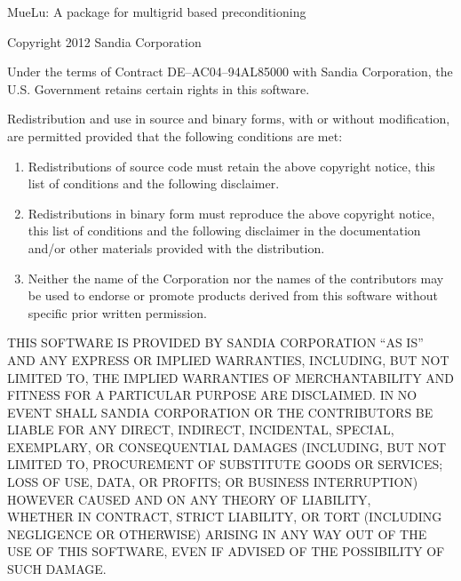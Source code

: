 \label{sec:license}
\begin{center}
MueLu: A package for multigrid based preconditioning

Copyright 2012 Sandia Corporation
\end{center}

\noindent
Under the terms of Contract DE--AC04--94AL85000 with Sandia Corporation,
the U.S. Government retains certain rights in this software.

\noindent
Redistribution and use in source and binary forms, with or without
modification, are permitted provided that the following conditions are
met:

\begin{enumerate}
  \item Redistributions of source code must retain the above copyright
    notice, this list of conditions and the following disclaimer.

\item Redistributions in binary form must reproduce the above copyright
  notice, this list of conditions and the following disclaimer in the
  documentation and/or other materials provided with the distribution.

\item Neither the name of the Corporation nor the names of the
  contributors may be used to endorse or promote products derived from
  this software without specific prior written permission.
\end{enumerate}

\noindent
THIS SOFTWARE IS PROVIDED BY SANDIA CORPORATION ``AS IS'' AND ANY
EXPRESS OR IMPLIED WARRANTIES, INCLUDING, BUT NOT LIMITED TO, THE
IMPLIED WARRANTIES OF MERCHANTABILITY AND FITNESS FOR A PARTICULAR
PURPOSE ARE DISCLAIMED\@. IN NO EVENT SHALL SANDIA CORPORATION OR THE
CONTRIBUTORS BE LIABLE FOR ANY DIRECT, INDIRECT, INCIDENTAL, SPECIAL,
EXEMPLARY, OR CONSEQUENTIAL DAMAGES (INCLUDING, BUT NOT LIMITED TO,
PROCUREMENT OF SUBSTITUTE GOODS OR SERVICES\@; LOSS OF USE, DATA, OR
PROFITS\@; OR BUSINESS INTERRUPTION) HOWEVER CAUSED AND ON ANY THEORY OF
LIABILITY, \\WHETHER IN CONTRACT, STRICT LIABILITY, OR TORT (INCLUDING
NEGLIGENCE OR OTHERWISE) ARISING IN ANY WAY OUT OF THE USE OF THIS
SOFTWARE, EVEN IF ADVISED OF THE POSSIBILITY OF SUCH DAMAGE\@.
